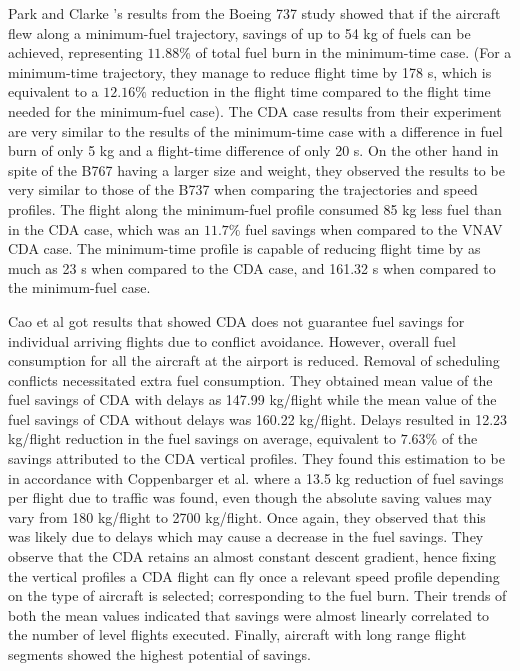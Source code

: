 \documentclass{aer1315-pretty}
\begin{document}
Park and Clarke \cite{Park:2015} 's results from the Boeing 737 study showed that if the aircraft flew along a minimum-fuel trajectory, savings of up to 54 kg of fuels can be achieved, representing $11.88\%$ of total fuel burn in the minimum-time case. (For a minimum-time trajectory, they manage to reduce flight time by 178 s, which is equivalent to a $12.16\%$ reduction in the flight time compared to the flight time needed for the minimum-fuel case). The CDA case results from their experiment are very similar to the results of the minimum-time case with a difference in fuel burn of only 5 kg and a flight-time difference of only 20 s. On the other hand in spite of the B767 having a larger size and weight, they observed the results to be very similar to those of the B737 when comparing the trajectories and speed profiles. The flight along the minimum-fuel profile consumed 85 kg less fuel than in the CDA case, which was an $11.7\%$ fuel savings when compared to the VNAV CDA case. The minimum-time profile is capable of reducing flight time by as much as 23 s when compared to the CDA case, and 161.32 s when compared to the minimum-fuel case.\par


Cao et al \cite{Cao:2013} got results that showed CDA does not guarantee fuel savings for individual arriving flights due to conflict avoidance. However, overall fuel consumption for all the aircraft at the airport is reduced. Removal of scheduling conflicts necessitated extra fuel consumption. They obtained mean value of the fuel savings of CDA with delays as 147.99 kg/flight while the mean value of the fuel savings of CDA without delays was 160.22 kg/flight. Delays resulted in  12.23 kg/flight reduction in the fuel savings on average, equivalent to $7.63\%$ of the savings attributed to the CDA vertical profiles. They found this estimation to be in accordance with Coppenbarger et al.\cite{Copp:2010b} where a 13.5 kg reduction of fuel savings per flight due to traffic was found, even though the absolute saving values may vary from 180 kg/flight to 2700 kg/flight. Once again, they observed that this was likely due to delays which may cause a decrease in the fuel savings. They observe that the CDA retains an almost constant descent gradient, hence fixing the vertical profiles a CDA flight can fly once a relevant speed profile depending on the type of aircraft 
is selected; corresponding to the fuel burn. Their trends of both the mean values indicated that savings were almost linearly correlated to the number of level flights executed. Finally, aircraft with long range flight segments showed the highest potential of savings. \par
\end{document}
